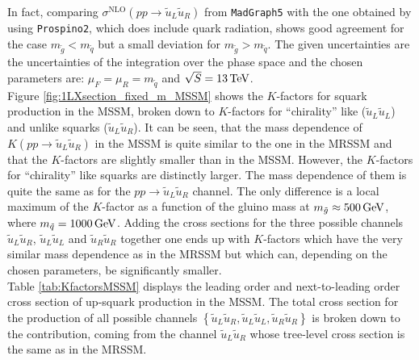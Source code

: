 In fact, comparing $\sigma^{\mathrm{NLO}}(pp \to \tilde{u}_L\tilde{u}_R)$ from \texttt{MadGraph5} with the one obtained by using \texttt{Prospino2}, which does include quark radiation, shows good agreement for the case $m_{\tilde{g}} < m_{\tilde{q}}$ but a small deviation for $m_{\tilde{g}} > m_{\tilde{q}}$. The given uncertainties are the uncertainties of the integration over the phase space and the chosen parameters are: $\mu_F = \mu_R = m_{\tilde{q}}$ and $\sqrt{S} = \unit[13]{TeV}$.\\
Figure \ref{fig:1LXsection_fixed_m_MSSM} shows the $K$-factors for squark production in the MSSM, broken down to $K$-factors for ``chirality'' like ($\tilde{u}_L \tilde{u}_L$) and unlike squarks ($\tilde{u}_L \tilde{u}_R$). It can be seen, that the mass dependence of $K(pp \to \tilde{u}_L \tilde{u}_R)$ in the MSSM is quite similar to the one in the MRSSM and that the $K$-factors are slightly smaller than in the MSSM. However, the $K$-factors for ``chirality'' like squarks are distinctly larger. The mass dependence of them is quite the same as for the  $pp \to \tilde{u}_L \tilde{u}_R$ channel. The only difference is a local maximum of the $K$-factor as a function of the gluino mass at $m_{\tilde{g}} \approx \unit[500]{GeV}$, where $m_{\tilde{q}} = \unit[1000]{GeV}$. Adding the cross sections for the three possible channels $\tilde{u}_L \tilde{u}_R$, $\tilde{u}_L \tilde{u}_L$ and $\tilde{u}_R \tilde{u}_R$ together one ends up with $K$-factors which have the very similar mass dependence as in the MRSSM but which can, depending on the chosen parameters, be significantly smaller.\\
Table \ref{tab:KfactorsMSSM} displays the leading order and next-to-leading order cross section of up-squark production in the MSSM. The total cross section for the production of all possible channels $\left\{ \tilde{u}_L\tilde{u}_R, \tilde{u}_L\tilde{u}_L, \tilde{u}_R\tilde{u}_R \right\}$ is broken down to the contribution, coming from the channel $\tilde{u}_L\tilde{u}_R$ whose tree-level cross section is the same as in the MRSSM.

